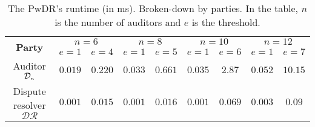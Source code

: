 

 \begin{table*}[!htb]
\caption{ \small The PwDR's runtime (in ms). Broken-down by parties. In the table, $n$ is the number of auditors and $e$ is the threshold.} \label{table::PwDR-runtime} 
\begin{center}

\begin{tabular}{|c|c|c|c|c|c|c|c|c|} 

   \hline
   

\multirow{2}{*}{\scriptsize \textbf{Party}}& \multicolumn{2}{c|}{\scriptsize $n=6$}& \multicolumn{2}{c|}{\scriptsize $n=8$}&\multicolumn{2}{c|}{\scriptsize $n=10$}&\multicolumn{2}{c|}{\scriptsize $n=12$}\\
 \cline{2-9} 
&\scriptsize$e=1$&\scriptsize$e=4$&\scriptsize$e=1$ &\scriptsize$e=5$&\scriptsize$e=1$&\scriptsize$e=6$&\scriptsize$e=1$&\scriptsize$e=7$\\

\hline

         
            \cline{1-5} 


   \scriptsize   {Auditor $\mathcal{D}_{\scriptscriptstyle n}$ }&\cellcolor{gray!20}\scriptsize$0.019$&\cellcolor{gray!20}\scriptsize$0.220$&\cellcolor{gray!20} \cellcolor{gray!20}\scriptsize$0.033$& \cellcolor{gray!20}\scriptsize$0.661$&\cellcolor{gray!20}\scriptsize$0.035$&\cellcolor{gray!20}\scriptsize$2.87$&\cellcolor{gray!20}\scriptsize$0.052$&\cellcolor{gray!20}\scriptsize$10.15$\\      
           
            \cline{1-5} 

 \scriptsize Dispute resolver $\mathcal{DR}$&\cellcolor{gray!20}\scriptsize$0.001$&\cellcolor{gray!20}\scriptsize$0.015$& \cellcolor{gray!20}\scriptsize $0.001$& \cellcolor{gray!20}\scriptsize$0.016$&\cellcolor{gray!20}\scriptsize$0.001$&\cellcolor{gray!20}\scriptsize$0.069$&\cellcolor{gray!20}\scriptsize$0.003$&\cellcolor{gray!20}\scriptsize$0.09$\\
 
 \hline
 
\end{tabular}  %
\end{center}

\end{table*}





